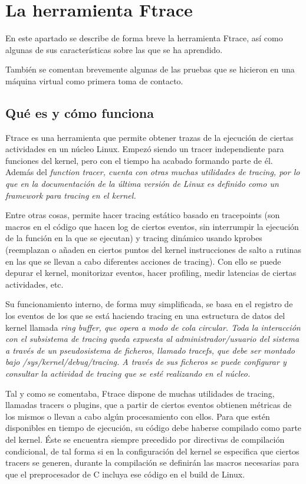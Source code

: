 \documentclass[../main.tex]{subfiles}
\begin{document}
\section{La herramienta Ftrace}

En este apartado se describe de forma breve la herramienta Ftrace, así como algunas de sus características sobre las que se ha aprendido. 

También se comentan brevemente algunas de las pruebas que se hicieron en una máquina virtual como primera toma de contacto.

\subsection{Qué es y cómo funciona}

Ftrace es una herramienta que permite obtener trazas de la ejecución de ciertas actividades en un núcleo Linux. Empezó siendo un tracer independiente para funciones del kernel, pero con el tiempo ha acabado formando parte de él. Además del \it{function tracer}, cuenta con otras muchas utilidades de tracing, por lo que en la documentación de la última versión de Linux \cite{documentacion-ftrace-Linux} es definido como un framework para tracing en el kernel.

Entre otras cosas, permite hacer tracing estático basado en tracepoints (son macros en el código que hacen log de ciertos eventos, sin interrumpir la ejecución de la función en la que se ejecutan) y tracing dinámico usando kprobes (reemplazan o añaden en ciertos puntos del kernel instrucciones de salto a rutinas en las que se llevan a cabo diferentes acciones de tracing). Con ello se puede depurar el kernel, monitorizar eventos, hacer profiling, medir latencias de ciertas actividades, etc. 

Su funcionamiento interno, de forma muy simplificada, se basa en el registro de los eventos de los que se está haciendo tracing en una estructura de datos del kernel llamada \it{ring buffer}, que opera a modo de cola circular. Toda la interacción con el subsistema de tracing queda expuesta al administrador/usuario del sistema a través de un pseudosistema de ficheros, llamado \it{tracefs}, que debe ser montado bajo \it{/sys/kernel/debug/tracing}. A través de sus ficheros se puede configurar y consultar la actividad de tracing que se esté realizando en el núcleo. 

Tal y como se comentaba, Ftrace dispone de muchas utilidades de tracing, llamadas tracers o plugins, que a partir de ciertos eventos obtienen métricas de los mismos o llevan a cabo algún procesamiento con ellos. Para que estén disponibles en tiempo de ejecución, su código debe haberse compilado como parte del kernel. Éste se encuentra siempre precedido por directivas de compilación condicional, de tal forma si en la configuración del kernel se especifica que ciertos tracers se generen, durante la compilación se definirán las macros necesarias para que el preprocesador de C incluya ese código en el build de Linux.
\end{document}
